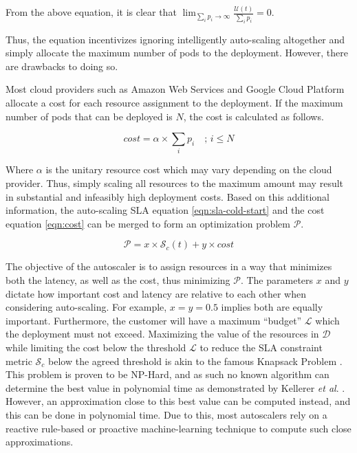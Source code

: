 From the above equation, it is clear that $\lim_{\sum_{i} p_{i} \to \infty} \frac{\mathcal{U}(t)}{\sum_{i} p_{i}} = 0$.


Thus, the equation incentivizes ignoring intelligently auto-scaling altogether and simply allocate the maximum number of pods to the deployment. However, there are drawbacks to doing so.\par

Most cloud providers such as Amazon Web Services and Google Cloud Platform allocate a cost for each resource assignment to the deployment. If the maximum number of pods that can be deployed is $N$, the cost is calculated as follows.

\begin{equation}
    cost = \alpha \times \sum_{i} p_{i} \quad ;\,i \le N
    \label{eqn:cost}
\end{equation}

Where $\alpha$ is the unitary resource cost which may vary depending on the cloud provider. Thus, simply scaling all resources to the maximum amount may result in substantial and infeasibly high deployment costs. Based on this additional information, the auto-scaling SLA equation \ref{eqn:sla-cold-start} and the cost equation \ref{eqn:cost} can be merged to form an optimization problem $\mathcal{P}$.

\begin{equation}
    \mathcal{P} = x \times \mathcal{S}_{c}(t) + y \times cost
    \label{eqn:optimization-problem}
\end{equation}

The objective of the autoscaler is to assign resources in a way that minimizes both the latency, as well as the cost, thus minimizing $\mathcal{P}$. The parameters $x$ and $y$ dictate how important cost and latency are relative to each other when considering auto-scaling. For example, $x = y = 0.5$ implies both are equally important. Furthermore, the customer will have a maximum ``budget'' $\mathcal{L}$ which the deployment must not exceed. Maximizing the value of the resources in $\mathcal{D}$ while limiting the cost below the threshold $\mathcal{L}$ to reduce the SLA constraint metric $\mathcal{S}_{c}$ below the agreed threshold is akin to the famous Knapsack Problem \cite{martello1987algorithms}. This problem is proven to be NP-Hard, and as such no known algorithm can determine the best value in polynomial time as demonstrated by Kellerer \textit{et al}. \cite{kellerer2004introduction}. However, an approximation close to this best value can be computed instead, and this can be done in polynomial time. Due to this, most autoscalers rely on a reactive rule-based or proactive machine-learning technique to compute such close approximations.\par

